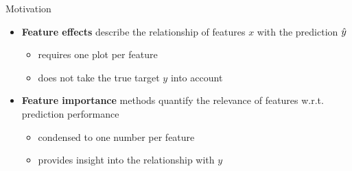 	
	
	

	

\begin{vbframe}{Motivation}
\begin{itemize}
  \item \textbf{Feature effects} describe the relationship of features $x$ with the prediction $\yh$
  \begin{itemize}
    \item requires one plot per feature
    \item does not take the true target $y$ into account
  \end{itemize}
  \item \textbf{Feature importance} methods quantify the relevance of features w.r.t. prediction performance
  \begin{itemize}
    \item condensed to one number per feature
    \item provides insight into the relationship with $y$
  \end{itemize}
\end{itemize}
\end{vbframe}

